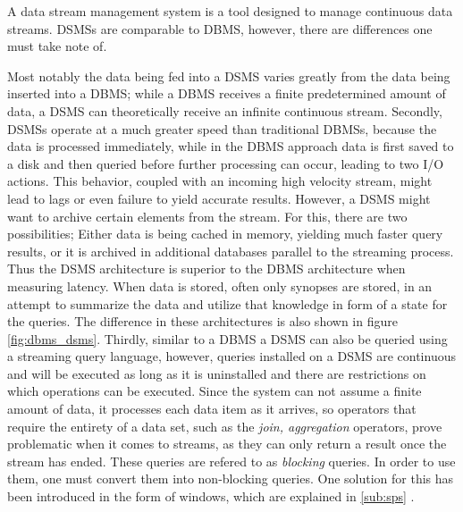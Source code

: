         A data stream management system is a tool designed to manage continuous data streams.
        DSMSs are comparable to DBMS, however, there are differences one must take note of.

        \quad Most notably the data being fed into a DSMS varies greatly from the data being inserted into a DBMS; while a DBMS receives a finite predetermined amount 
        of data, a DSMS can theoretically receive an infinite continuous stream.
        Secondly, DSMSs operate at a much greater speed than traditional DBMSs, because the data is processed immediately, while in the DBMS approach
        data is first saved to a disk and then queried before further processing can occur, leading to two I/O actions. This behavior, coupled with an incoming 
        high velocity stream, might lead to lags or even failure to yield accurate results\cite{StreamBookQuality}. 
        However, a DSMS might want to archive certain elements from the stream. For this, there are two possibilities;
        Either data is being cached in memory, yielding much faster query results, or it is archived in additional databases parallel to the streaming process.
        Thus the DSMS architecture is superior to the DBMS architecture when measuring latency.
        When data is stored, often only synopses are stored, in an attempt to summarize the data and utilize that knowledge in form of a \gls{state} for the queries.
        The difference in these architectures is also shown in figure \ref{fig:dbms_dsms}\cite{StreamBookQuality}.
        Thirdly, similar to a DBMS a DSMS can also be queried using a streaming query language, however, queries installed on a DSMS are continuous 
        and will be executed as long as it is uninstalled and there are restrictions on which operations can be executed.
        Since the system can not assume a finite amount of data, it processes each data item as it arrives, so operators that require the entirety of a data 
        set, such as the \textit{join, aggregation} operators, prove problematic when it comes to streams, 
        as they can only return a result once the stream has ended\cite[p.12]{StreamBookQuality}.
        These queries are refered to as \textit{blocking} queries. In order to use them, one must convert them into non-blocking queries.
        One solution for this has been introduced in the form of windows, which are explained in \ref{sub:sps} .

